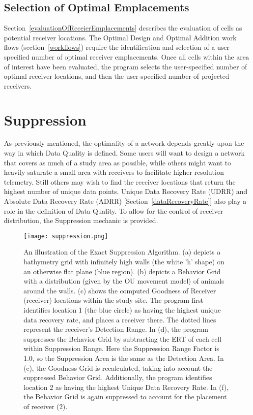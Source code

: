 \subsection{Selection of Optimal Emplacements}
\label{selectionOfOptimalEmplacements}
Section~\ref{evaluationOfReceierEmplacements} describes the evaluation of cells as potential receiver locations.  The Optimal Design and Optimal Addition work flows (section~\ref{workflows}) require the identification and selection of a user-specified number of optimal receiver emplacements.  Once all cells within the area of interest have been evaluated, the program selects the user-specified number of optimal receiver locations, and then the user-specified number of projected receivers.


\section{Suppression}
\label{suppression}
As previously mentioned, the optimality of a network depends greatly upon the way in which Data Quality is defined.  Some users will want to design a network that covers as much of a study area as possible, while others might want to heavily saturate a small area with receivers to facilitate higher resolution telemetry.  Still others may wish to find the receiver locations that return the highest number of unique data points.  Unique Data Recovery Rate (UDRR) and Absolute Data Recovery Rate (ADRR) [Section~\ref{dataRecoveryRate}] also play a role in the definition of Data Quality.  To allow for the control of receiver distribution, the Suppression mechanic is provided.


\begin{figure}[ht]
	\centering
	\texttt{[image: suppression.png]}
	\caption{An illustration of the Exact Suppression Algorithm.  (a) depicts a bathymetry grid with infinitely high walls (the white 'h' shape) on an otherwise flat plane (blue region).  (b) depicts a Behavior Grid with a distribution (given by the OU movement model) of animals around the walls.  (c) shows the computed Goodness of Receiver (receiver) locations within the study site.  The program first identifies location 1 (the blue circle) as having the highest unique data recovery rate, and places a receiver there.  The dotted lines represent the receiver's Detection Range.  In (d), the program suppresses the Behavior Grid by subtracting the ERT of each cell within Suppression Range.  Here the Suppression Range Factor is 1.0, so the Suppression Area is the same as the Detection Area.  In (e), the Goodness Grid is recalculated, taking into account the suppressed Behavior Grid.  Additionally, the program identifies location 2 as having the highest Unique Data Recovery Rate.  In (f), the Behavior Grid is again suppressed to account for the placement of receiver (2).
		\label{suppressionImage}}
\end{figure}


